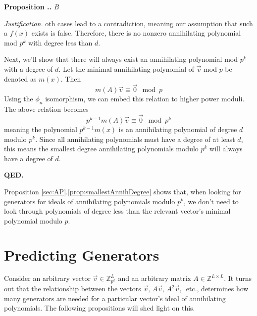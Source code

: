 \documentclass[a4paper, reqno, 12pt]{amsart}
\newcounter{propcounter}[section]
\newenvironment{proposition}[1]
{
	\refstepcounter{propcounter}
	\textbf{Proposition \thesection.\thepropcounter.} \emph{#1}
	
	\emph{Justification.}
}
{
	\textbf{QED.} \\
}
\begin{document}
\begin{proposition}
			Both cases lead to a contradiction, meaning our assumption that such a $f(x)$ exists is false. Therefore, there is no nonzero annihilating polynomial mod $p^k$ 
			with degree less than $d$.
			
			Next, we'll show that there will always exist an annihilating polynomial mod $p^k$ with a degree of $d$. Let the minimal annihilating polynomial of $\vec{v}$ mod
			$p$ be denoted as $m(x)$. Then
			\[
				m(A)\vec{v} \equiv \vec{0} \mod{p}
			\]
			Using the $\phi_n$ isomorphism, we can embed this relation to higher power moduli. The above relation becomes
			\[
				p^{k-1}m(A)\vec{v} \equiv \vec{0} \mod{p^k}
			\]
			meaning the polynomial $p^{k-1}m(x)$ is an annihilating polynomial of degree $d$ modulo $p^k$. Since all annihilating polynomials must have a degree of at least $
			d$, this means the smallest degree annihilating polynomials modulo $p^k$ will always have a degree of $d$.
		\end{proposition}
		
		Proposition \ref{sec:AP}.\ref{prop:smallestAnnihDegree} shows that, when looking for generators for ideals of annihilating polynomials modulo $p^k$, we don't need to
		look through polynomials of degree less than the relevant vector's minimal polynomial modulo $p$.
		
	\section{Predicting Generators}
		\label{sec:PG}
		Consider an arbitrary vector $\vec{v} \in \mathds{Z}_{p^k}^L$ and an arbitrary matrix $A \in \mathds{Z}^{L \times L}$. It turns out that the relationship between the
		vectors $\vec{v},\, A\vec{v},\, A^2\vec{v},\,$ etc., determines how many generators are needed for a particular vector's ideal of annihilating polynomials. The 
		following propositions will shed light on this.
		
\end{document}
